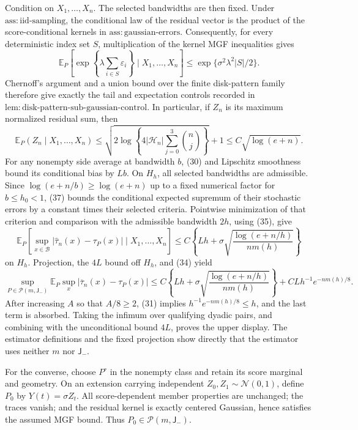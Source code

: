 Condition on \(X_1,\ldots,X_n\).  The selected bandwidths are then fixed.  Under \(\mathrm{ass:iid\text{-}sampling}\), the conditional law of the residual vector is the product of the score-conditional kernels in \(\mathrm{ass:gaussian\text{-}errors}\).  Consequently, for every deterministic index set \(S\), multiplication of the kernel MGF inequalities gives
\[
 \mathbb E_P\!\left[\exp\!\left\{\lambda\sum_{i\in S}\varepsilon_i\right\}\mid X_1,\ldots,X_n\right]
 \le \exp\{\sigma^2\lambda^2|S|/2\}. \tag{36}
\]
Chernoff's argument and a union bound over the finite disk-pattern family therefore give exactly the tail and expectation controls recorded in \(\mathrm{lem:disk\text{-}pattern\text{-}sub\text{-}gaussian\text{-}control}\).  In particular, if \(Z_n\) is its maximum normalized residual sum, then
\[
 \mathbb E_P(Z_n\mid X_1,\ldots,X_n)
 \le\sqrt{2\log\left\{4|\mathcal H_n|\sum_{j=0}^3\binom nj\right\}}+1
 \le C\sqrt{\log(e+n)}. \tag{37}
\]
For any nonempty side average at bandwidth \(b\), (30) and Lipschitz smoothness bound its conditional bias by \(Lb\).  On \(H_h\), all selected bandwidths are admissible.  Since \(\log(e+n/b)\ge\log(e+n)\) up to a fixed numerical factor for \(b\le h_0<1\), (37) bounds the conditional expected supremum of their stochastic errors by a constant times their selected criteria.  Pointwise minimization of that criterion and comparison with the admissible bandwidth \(2h\), using (35), give
\[
 \mathbb E_P\!\left[\sup_{x\in\mathcal B}|\widehat\tau_n(x)-\tau_P(x)|\mid X_1,\ldots,X_n\right]
 \le C\left\{Lh+\sigma\sqrt{\frac{\log(e+n/h)}{nm(h)}}\right\} \tag{38}
\]
on \(H_h\).  Projection, the \(4L\) bound off \(H_h\), and (34) yield
\[
 \sup_{P\in\mathcal P(m,\mathsf J_-)}\mathbb E_P\sup_x|\overline\tau_n(x)-\tau_P(x)|
 \le C\left\{Lh+\sigma\sqrt{\frac{\log(e+n/h)}{nm(h)}}\right\}
 +CLh^{-1}e^{-nm(h)/8}. \tag{39}
\]
After increasing \(A\) so that \(A/8\ge2\), (31) implies \(h^{-1}e^{-nm(h)/8}\le h\), and the last term is absorbed.  Taking the infimum over qualifying dyadic pairs, and combining with the unconditional bound \(4L\), proves the upper display.  The estimator definitions and the fixed projection show directly that the estimator uses neither \(m\) nor \(\mathsf J_-\).

For the converse, choose \(P^\circ\) in the nonempty class and retain its score marginal and geometry.  On an extension carrying independent \(Z_0,Z_1\sim\mathcal N(0,1)\), define \(P_0\) by \(Y(t)=\sigma Z_t\).  All score-dependent member properties are unchanged; the traces vanish; and the residual kernel is exactly centered Gaussian, hence satisfies the assumed MGF bound.  Thus \(P_0\in\mathcal P(m,\mathsf J_-)\).

